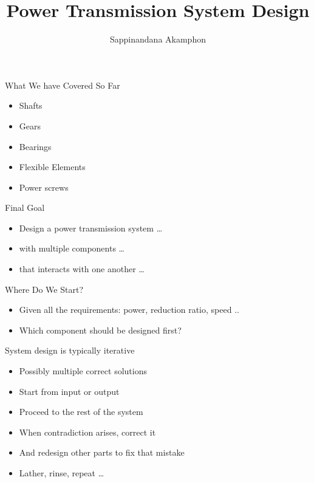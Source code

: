 \documentclass[10pt, svgnames]{beamer}
\author{Sappinandana Akamphon}
\date{}
\title{Power Transmission System Design}
\institute{ME TSE}
\begin{document}
\maketitle

\begin{frame}[label={sec:orgfa8502d}]{What We have Covered So Far}
\begin{itemize}
\item Shafts
\item Gears
\item Bearings
\item Flexible Elements
\item Power screws
\end{itemize}
\end{frame}

\begin{frame}[label={sec:org1dbb49b}]{Final Goal}
\begin{itemize}
\item Design a power transmission system \ldots{}

\item with multiple components \ldots{}

\item that interacts with one another \ldots{}
\end{itemize}
\end{frame}

\begin{frame}[label={sec:orgb07bb9c}]{Where Do We Start?}
\begin{itemize}
\item Given all the requirements: power, reduction ratio, speed ..
\item Which component should be designed first?
\end{itemize}
\end{frame}

\begin{frame}[label={sec:orgf953baf}]{System design is typically iterative}
\begin{itemize}
\item Possibly multiple correct solutions
\item Start from input or output
\item Proceed to the rest of the system
\item When contradiction arises, correct it
\item And redesign other parts to fix that mistake
\item Lather, rinse, repeat \ldots{}
\end{itemize}
\end{frame}
\end{document}

